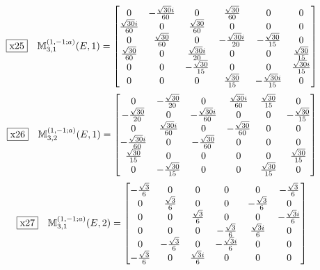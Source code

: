\documentclass[fleqn,10pt,landscape]{jsarticle}
\begin{document}
\begin{dmath*}
\fbox{x25}\quad \mathbb{M}_{3,1}^{(1,-1;a)}(E,1)=\begin{bmatrix} 0 & - \frac{\sqrt{30} i}{60} & 0 & \frac{\sqrt{30}}{60} & 0 & 0 \\ \frac{\sqrt{30} i}{60} & 0 & \frac{\sqrt{30}}{60} & 0 & 0 & 0 \\ 0 & \frac{\sqrt{30}}{60} & 0 & - \frac{\sqrt{30} i}{20} & - \frac{\sqrt{30}}{15} & 0 \\ \frac{\sqrt{30}}{60} & 0 & \frac{\sqrt{30} i}{20} & 0 & 0 & \frac{\sqrt{30}}{15} \\ 0 & 0 & - \frac{\sqrt{30}}{15} & 0 & 0 & \frac{\sqrt{30} i}{15} \\ 0 & 0 & 0 & \frac{\sqrt{30}}{15} & - \frac{\sqrt{30} i}{15} & 0 \end{bmatrix}
\end{dmath*}
\begin{dmath*}
\fbox{x26}\quad \mathbb{M}_{3,2}^{(1,-1;a)}(E,1)=\begin{bmatrix} 0 & - \frac{\sqrt{30}}{20} & 0 & \frac{\sqrt{30} i}{60} & \frac{\sqrt{30}}{15} & 0 \\ - \frac{\sqrt{30}}{20} & 0 & - \frac{\sqrt{30} i}{60} & 0 & 0 & - \frac{\sqrt{30}}{15} \\ 0 & \frac{\sqrt{30} i}{60} & 0 & - \frac{\sqrt{30}}{60} & 0 & 0 \\ - \frac{\sqrt{30} i}{60} & 0 & - \frac{\sqrt{30}}{60} & 0 & 0 & 0 \\ \frac{\sqrt{30}}{15} & 0 & 0 & 0 & 0 & \frac{\sqrt{30}}{15} \\ 0 & - \frac{\sqrt{30}}{15} & 0 & 0 & \frac{\sqrt{30}}{15} & 0 \end{bmatrix}
\end{dmath*}
\begin{dmath*}
\fbox{x27}\quad \mathbb{M}_{3,1}^{(1,-1;a)}(E,2)=\begin{bmatrix} - \frac{\sqrt{3}}{6} & 0 & 0 & 0 & 0 & - \frac{\sqrt{3}}{6} \\ 0 & \frac{\sqrt{3}}{6} & 0 & 0 & - \frac{\sqrt{3}}{6} & 0 \\ 0 & 0 & \frac{\sqrt{3}}{6} & 0 & 0 & - \frac{\sqrt{3} i}{6} \\ 0 & 0 & 0 & - \frac{\sqrt{3}}{6} & \frac{\sqrt{3} i}{6} & 0 \\ 0 & - \frac{\sqrt{3}}{6} & 0 & - \frac{\sqrt{3} i}{6} & 0 & 0 \\ - \frac{\sqrt{3}}{6} & 0 & \frac{\sqrt{3} i}{6} & 0 & 0 & 0 \end{bmatrix}
\end{dmath*}
\end{document}

